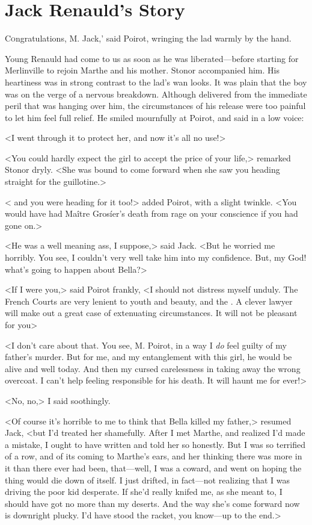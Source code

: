 \chapter{Jack Renauld's Story}
	
\lettrine[ante=`]Congratulations, M. Jack,' said Poirot, wringing the lad warmly by the hand. 

\zz
 Young Renauld had come to us as soon as he was liberated—before starting for Merlinville to rejoin Marthe and his mother. Stonor accompanied him. His heartiness was in strong contrast to the lad's wan looks. It was plain that the boy was on the verge of a nervous breakdown. Although delivered from the immediate peril that was hanging over him, the circumstances of his release were too painful to let him feel full relief. He smiled mournfully at Poirot, and said in a low voice: 

 <I went through it to protect her, and now it's all no use!> 

 <You could hardly expect the girl to accept the price of your life,> remarked Stonor dryly. <She was bound to come forward when she saw you heading straight for the guillotine.> 

 < and you were heading for it too!> added Poirot, with a slight twinkle. <You would have had Maître Grosíer's death from rage on your conscience if you had gone on.> 

 <He was a well meaning ass, I suppose,> said Jack. <But he worried me horribly. You see, I couldn't very well take him into my confidence. But, my God! what's going to happen about Bella?> 

 <If I were you,> said Poirot frankly, <I should not distress myself unduly. The French Courts are very lenient to youth and beauty, and the . A clever lawyer will make out a great case of extenuating circumstances. It will not be pleasant for you\longdash> 

 <I don't care about that. You see, M. Poirot, in a way I \emph{do} feel guilty of my father's murder. But for me, and my entanglement with this girl, he would be alive and well today. And then my cursed carelessness in taking away the wrong overcoat. I can't help feeling responsible for his death. It will haunt me for ever!> 

 <No, no,> I said soothingly. 

 <Of course it's horrible to me to think that Bella killed my father,> resumed Jack, <but I'd treated her shamefully. After I met Marthe, and realized I'd made a mistake, I ought to have written and told her so honestly. But I was so terrified of a row, and of its coming to Marthe's ears, and her thinking there was more in it than there ever had been, that—well, I was a coward, and went on hoping the thing would die down of itself. I just drifted, in fact—not realizing that I was driving the poor kid desperate. If she'd really knifed me, as she meant to, I should have got no more than my deserts. And the way she's come forward now is downright plucky. I'd have stood the racket, you know—up to the end.> 


